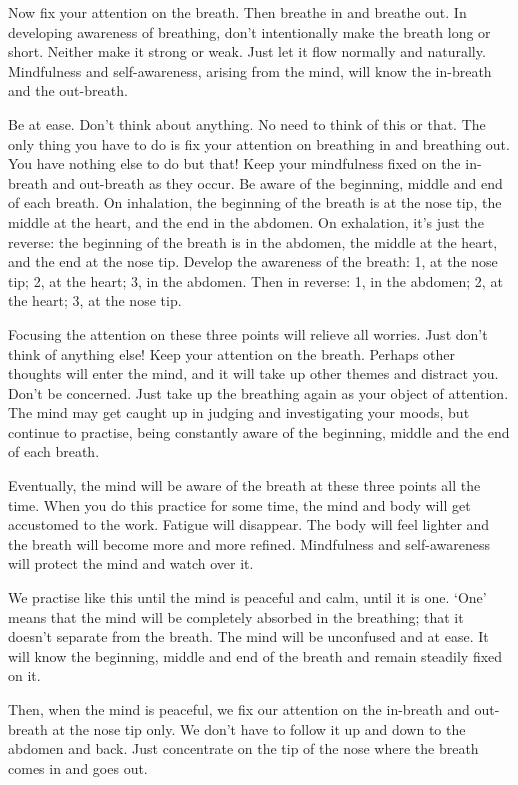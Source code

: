 Now fix your attention on the breath. Then breathe in and breathe out. In developing awareness of breathing, don't intentionally make the breath long or short. Neither make it strong or weak. Just let it flow normally and naturally. Mindfulness and self-awareness, arising from the mind, will know the in-breath and the out-breath.

Be at ease. Don't think about anything. No need to think of this or that. The only thing you have to do is fix your attention on breathing in and breathing out. You have nothing else to do but that! Keep your mindfulness fixed on the in-breath and out-breath as they occur. Be aware of the beginning, middle and end of each breath. On inhalation, the beginning of the breath is at the nose tip, the middle at the heart, and the end in the abdomen. On exhalation, it's just the reverse: the beginning of the breath is in the abdomen, the middle at the heart, and the end at the nose tip. Develop the awareness of the breath: 1, at the nose tip; 2, at the heart; 3, in the abdomen. Then in reverse: 1, in the abdomen; 2, at the heart; 3, at the nose tip.

Focusing the attention on these three points will relieve all worries. Just don't think of anything else! Keep your attention on the breath. Perhaps other thoughts will enter the mind, and it will take up other themes and distract you. Don't be concerned. Just take up the breathing again as your object of attention. The mind may get caught up in judging and investigating your moods, but continue to practise, being constantly aware of the beginning, middle and the end of each breath.

Eventually, the mind will be aware of the breath at these three points all the time. When you do this practice for some time, the mind and body will get accustomed to the work. Fatigue will disappear. The body will feel lighter and the breath will become more and more refined. Mindfulness and self-awareness will protect the mind and watch over it.

We practise like this until the mind is peaceful and calm, until it is one. `One' means that the mind will be completely absorbed in the breathing; that it doesn't separate from the breath. The mind will be unconfused and at ease. It will know the beginning, middle and end of the breath and remain steadily fixed on it.

Then, when the mind is peaceful, we fix our attention on the in-breath and out-breath at the nose tip only. We don't have to follow it up and down to the abdomen and back. Just concentrate on the tip of the nose where the breath comes in and goes out.

